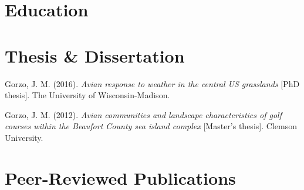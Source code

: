 \documentclass[11pt,a4paper,]{moderncv}
\newlength{\cslhangindent}
\newenvironment{CSLReferences}[2] %
 {\begin{list}{}{%
  \setlength{\itemindent}{0pt}
  \setlength{\leftmargin}{0pt}
  \setlength{\parsep}{0pt}
  \ifodd #1
   \setlength{\leftmargin}{\cslhangindent}
   \setlength{\itemindent}{-1\cslhangindent}
  \fi
  \setlength{\itemsep}{#2\baselineskip}}}
 {\end{list}}
\begin{document}
\section{Education}\label{education}

\nopagebreak

\section{Thesis \& Dissertation}\label{thesis-dissertation}

\label{refs-f367779abe3e8f51d322e48b3ae464cd}
\begin{CSLReferences}{1}{0}
Gorzo, J. M. (2016). \emph{Avian response to weather in the central US
grasslands} {[}PhD thesis{]}. The University of Wisconsin-Madison.

Gorzo, J. M. (2012). \emph{Avian communities and landscape
characteristics of golf courses within the Beaufort County sea island
complex} {[}Master's thesis{]}. Clemson University.

\end{CSLReferences}

\section{Peer-Reviewed Publications}\label{peer-reviewed-publications}
\end{document}
